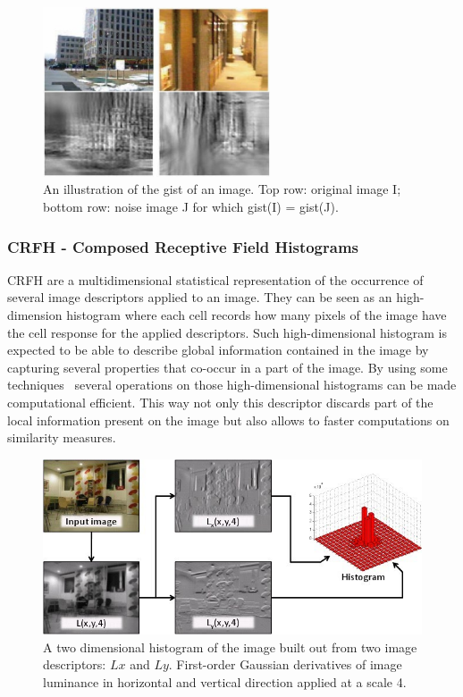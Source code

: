 \begin{figure}[h]
\center
\includegraphics[width=0.60\textwidth]{figures/gist.jpg}
\caption{\label{fig:gist}An illustration of the gist of an image. Top row: original image I;
         bottom row: noise image J for which gist(I) = gist(J).}
\end{figure}


\subsubsection*{{CRFH} - Composed Receptive Field Histograms}
\label{sec:crfh}\label{sec:global-features}
\gls{CRFH} are a multidimensional statistical
representation of the occurrence of several image descriptors applied to an
image. They can be seen as an high-dimension histogram where each cell records
how many pixels of the image have the cell response for the applied descriptors.
Such high-dimensional histogram is expected to be able to describe global
information contained in the image by capturing several properties that co-occur
in a part of the image.
By using some techniques~\cite{linde2004object} several operations on those
high-dimensional histograms can be made computational efficient. This way not
only this descriptor discards part of the local information present on the image
but also allows to faster computations on similarity measures.


\begin{figure}[h]
\begin{center}
\includegraphics[width=1\textwidth]{figures/crfh_model.jpg}
\end{center}
\caption{A two dimensional histogram of the image built out from two image
         descriptors: $Lx$ and $Ly$. First-order Gaussian derivatives of image
         luminance in horizontal and vertical direction applied at a scale 4.}
\end{figure}

